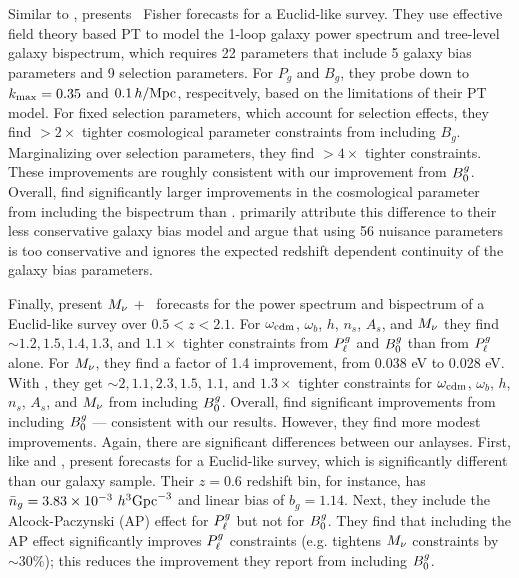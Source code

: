 Similar to \cite{yankelevich2019}, \cite{agarwal2020} presents \lcdm~Fisher 
forecasts for a Euclid-like survey. 
They use effective field theory based PT to model the
1-loop galaxy power spectrum and tree-level galaxy bispectrum, which
requires 22 parameters that include 5 galaxy bias parameters and 9 selection 
parameters. For $P_g$ and $B_g$, they probe down to $k_{\rm max} = 0.35$ and
$0.1\,h/\mathrm{Mpc}$, respecitvely, based on the limitations of their PT model. 
For fixed selection parameters, which account for selection effects, they find $>2\times$
tighter cosmological parameter constraints from including $B_g$. Marginalizing
over selection parameters, they find $>4\times$ tighter constraints. These 
improvements are roughly consistent with our improvement from $B^g_0$. 
Overall, \cite{agarwal2020} find significantly larger improvements in the
cosmological parameter from including the bispectrum than \cite{yankelevich2019}. 
\cite{agarwal2020} primarily attribute this difference to their less conservative
galaxy bias model and argue that using 56 nuisance parameters~\citep{yankelevich2019} 
is too conservative and ignores the expected redshift dependent continuity 
of the galaxy bias parameters. 

Finally, \cite{chudaykin2019} present $M_\nu$ + \lcdm~forecasts for the power
spectrum and bispectrum of a Euclid-like survey over $0.5 < z < 2.1$. For
$\omega_{\rm cdm}$, $\omega_b$, $h$, $n_s$, $A_s$, and $M_\nu$ they find
${\sim}1.2, 1.5, 1.4, 1.3$, and $1.1\times$ tighter constraints from $P^g_{\ell}$ and
$B^g_0$ than from $P^g_{\ell}$ alone. For $M_\nu$, they find a factor of 1.4 improvement, 
from 0.038 eV to 0.028 eV. With \planck, they get ${\sim}2, 1.1, 2.3, 1.5$,
$1.1$, and $1.3\times$ tighter constraints for $\omega_{\rm cdm}$, $\omega_b$,
$h$, $n_s$, $A_s$, and $M_\nu$ from including $B^g_0$. Overall, \cite{chudaykin2019} 
find significant improvements from including $B^g_0$ --- consistent with our
results. However, they find more modest improvements. 
Again, there are significant differences between our anlayses. First, like
\cite{yankelevich2019} and \cite{agarwal2020}, \cite{chudaykin2019} present forecasts for a
Euclid-like survey, which is significantly different than our galaxy sample.
Their $z = 0.6$ redshift bin, for instance, has $\bar{n}_g = 3.83 \times 10^{-3}~h^3{\rm
Gpc}^{-3}$ and linear bias of $b_g = 1.14$. Next, they include the
Alcock-Paczynski (AP) effect for $P^g_{\ell}$ but not for $B^g_0$. They find that
including the AP effect significantly improves $P^g_{\ell}$ constraints (e.g.
tightens $M_\nu$ constraints by ${\sim}30\%$); this reduces the improvement
they report from including $B^g_0$. 

